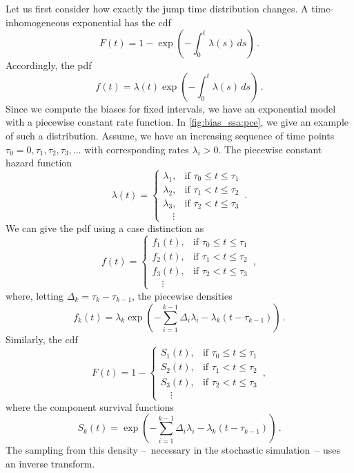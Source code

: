 Let us first consider how exactly the jump time distribution changes.
A time-inhomogeneous exponential has the cdf
\[
  F(t) = 1 - \exp\left(-\int_0^t \lambda(s)\,ds\right)\,.
\]
Accordingly, the pdf
\[
  f(t) = \lambda(t)\exp\left(-\int_0^t \lambda(s)\,ds\right)\,.
\]
Since we compute the biases for fixed intervals, we have an
exponential model with a piecewise constant rate function.
In \autoref{fig:bias_ssa:pce}, we give an example of such a distribution.
Assume, we have an increasing sequence of time points $\tau_0=0,
\tau_1, \tau_2, \tau_3, \dots$ with corresponding rates $\lambda_i >0$.
The piecewise constant hazard function
\[
  \lambda(t) =
  \begin{cases}
    \lambda_1, & \text{if } \tau_0 \leq t \leq \tau_1\\
    \lambda_2, & \text{if } \tau_1 < t \leq \tau_2\\
    \lambda_3, & \text{if } \tau_2 < t \leq \tau_3\\
    \quad\vdots
  \end{cases}\,.
\]
We can give the pdf using a case distinction as
\begin{equation}
  f(t) =
  \begin{cases}
    f_1(t), & \text{if }\tau_0 \leq t \leq \tau_1\\
    f_2(t), & \text{if }\tau_1 < t \leq \tau_2\\
    f_3(t), & \text{if }\tau_2 < t \leq \tau_3\\
    \quad\vdots
  \end{cases}\,,
\end{equation}
where, letting $\Delta_k = \tau_k - \tau_{k-1}$, the piecewise densities
\[
  f_k(t) = \lambda_k \exp \left( -\sum_{i=1}^{k-1}\Delta_i\lambda_i -
  \lambda_k\left(t - \tau_{k-1}\right)\right)\,.
\]
Similarly, the cdf
\begin{equation}
  F(t) = 1 -
  \begin{cases}
    S_1(t), & \text{if }\tau_0 \leq t \leq \tau_1\\
    S_2(t), & \text{if }\tau_1 < t \leq \tau_2\\
    S_3(t), & \text{if }\tau_2 < t \leq \tau_3\\
    \quad\vdots
  \end{cases}\,,
\end{equation}
where the component survival functions
\[
  S_k(t) = \exp \left( -\sum_{i=1}^{k-1}\Delta_i\lambda_i -
  \lambda_k\left(t - \tau_{k-1}\right)\right)\,.
\]
The sampling from this density --~necessary in the stochastic
simulation~-- uses an inverse transform.
